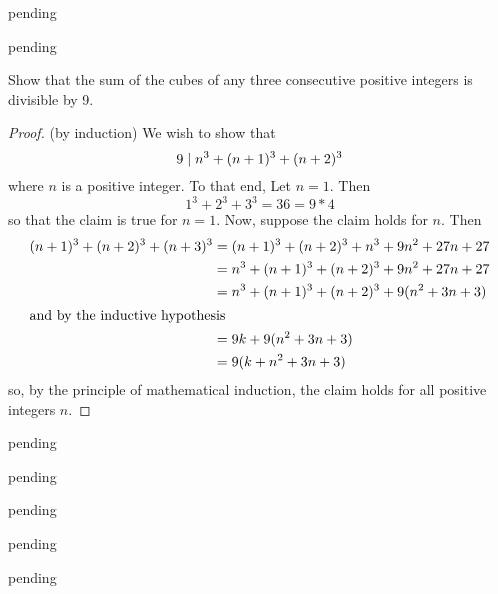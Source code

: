 \begin{exercise} \label{0.89}
	pending
\end{exercise}

\begin{exercise} \label{0.90}
	pending
\end{exercise}

\begin{exercise} \label{0.91}
	Show that the sum of the cubes of any three consecutive positive integers is divisible by 9.
	
	\begin{proof} (by induction) We wish to show that
	    \[ 9 \hspace{1mm} \vert \hspace{1mm} n^3 + (n+1)^3 + (n+2)^3 \]
	    where \( n \) is a positive integer. To that end, Let \( n=1 \). Then 
        \[ 1^3+2^3+3^3 = 36 = 9*4 \]
        so that the claim is true for \( n=1 \). Now, suppose the claim holds for \( n \). Then
        \begin{align*}
            (n+1)^3 + (n+2)^3 + (n+3)^3 &= (n+1)^3 + (n+2)^3 + n^3 + 9n^2 + 27n + 27 \\
            &= n^3 + (n+1)^3 + (n+2)^3 + 9n^2 + 27n + 27 \\
            &= n^3 + (n+1)^3 + (n+2)^3 + 9(n^2 + 3n + 3) \\
            \intertext{and by the inductive hypothesis}
            &= 9k + 9(n^2 + 3n + 3) \\
            &= 9(k + n^2 + 3n + 3)
        \end{align*}
        so, by the principle of mathematical induction, the claim holds for all positive integers \( n \).
	\end{proof}
\end{exercise}

\begin{exercise} \label{0.92}
	pending
\end{exercise}

\begin{exercise} \label{0.93}
	pending
\end{exercise}

\begin{exercise} \label{0.94}
	pending
\end{exercise}

\begin{exercise} \label{0.95}
	pending
\end{exercise}

\begin{exercise} \label{0.96}
	pending
\end{exercise}

